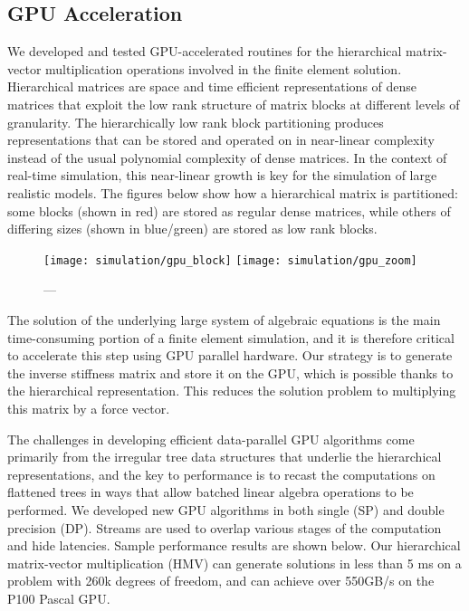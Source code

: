 \subsection{GPU Acceleration}\label{ssec:gpu_acceleration}

We developed and tested GPU-accelerated routines for the hierarchical matrix-vector multiplication operations involved in the finite element solution. Hierarchical matrices are space and time efficient representations of dense matrices that exploit the low rank structure of matrix blocks at different levels of granularity. The hierarchically low rank block partitioning produces representations that can be stored and operated on in near-linear complexity instead of the usual polynomial complexity of dense matrices. In the context of real-time simulation, this near-linear growth is key for the simulation of large realistic models. The figures below show how a hierarchical matrix is partitioned: some blocks (shown in red) are stored as regular dense matrices, while others of differing sizes (shown in blue/green) are stored as low rank blocks.

\begin{figure}
  \centering%
	\texttt{[image: simulation/gpu\_block]}\vspace{2ex}
	\texttt{[image: simulation/gpu\_zoom]}\\
	\caption{---}\label{fig:gpu_matrix}
\end{figure}

The solution of the underlying large system of algebraic equations is the main time-consuming portion of a finite element simulation, and it is therefore critical to accelerate this step using GPU parallel hardware. Our strategy is to generate the inverse stiffness matrix and store it on the GPU, which is possible thanks to the hierarchical representation. This reduces the solution problem to multiplying this matrix by a force vector.

The challenges in developing efficient data-parallel GPU algorithms come primarily from the irregular tree data structures that underlie the hierarchical representations, and the key to performance is to recast the computations on flattened trees in ways that allow batched linear algebra operations to be performed. We developed new GPU algorithms in both single (SP) and double precision (DP). Streams are used to overlap various stages of the computation and hide latencies. Sample performance results are shown below. Our hierarchical matrix-vector multiplication (HMV) can generate solutions in less than 5 ms on a problem with 260k degrees of freedom, and can achieve over 550GB/s on the P100 Pascal GPU.

